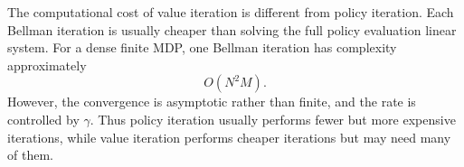 The computational cost of value iteration is different from policy iteration. Each Bellman
iteration is usually cheaper than solving the full policy evaluation linear system. For a dense
finite MDP, one Bellman iteration has complexity approximately
\[
O(N^2M).
\]
However, the convergence is asymptotic rather than finite, and the rate is controlled by
\(\gamma\). Thus policy iteration usually performs fewer but more expensive iterations, while
value iteration performs cheaper iterations but may need many of them.